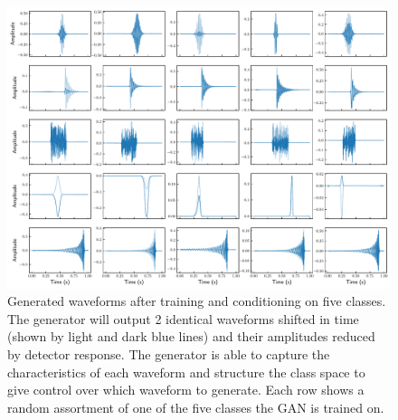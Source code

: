 \documentclass[12pt]{iopart}
\begin{document}
\begin{figure}[h]
    \centering
    \includegraphics[width=\textwidth]{figures/generations.pdf}
    \caption{Generated waveforms after training and conditioning on five classes. The generator will output 2 identical waveforms shifted in time (shown by light and dark blue lines) and their amplitudes reduced by detector response. The generator is able to capture the characteristics of each waveform and structure the class space to give control over which waveform to generate. Each row shows a random assortment of one of the five classes the GAN is trained on. }
    \label{fig:gen_signals}
\end{figure}
\end{document}
